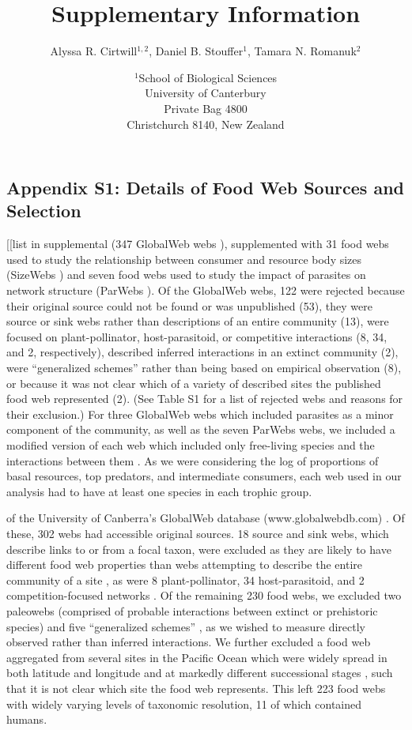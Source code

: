 \documentclass[12pt]{article}
\title{Supplementary Information}
\author{Alyssa R. Cirtwill$^{1,2}$, Daniel B. Stouffer$^{1}$, Tamara N. Romanuk$^{2}$}
\date{$^1$School of Biological Sciences\\University of Canterbury\\
Private Bag 4800\\Christchurch 8140, New Zealand}
\newcommand{\beginsupplement}{%
        \setcounter{table}{0}
        \renewcommand{\thetable}{S\arabic{table}}%
        \setcounter{figure}{0}
        \renewcommand{\thefigure}{S\arabic{figure}}%
     }
\begin{document}
\maketitle
\baselineskip=8.5mm

\vspace{0.4 in}
\beginsupplement
\begin{landscape}
\subsection*{Appendix S1: Details of Food Web Sources and Selection}

  [[list in supplemental (347 GlobalWeb webs \citep{GlobalWeb}), supplemented 
  with 31 food webs used to study the relationship between consumer and resource body sizes (SizeWebs \citep{Brose2006})
  and seven food webs used to study the impact of parasites on network structure (ParWebs \citep{Dunne2013}).
  Of the GlobalWeb webs, 122 were rejected because their original source could not be found or was unpublished (53), they were source or sink
  webs rather than descriptions of an entire community (13), were focused on plant-pollinator, host-parasitoid, or 
  competitive interactions (8, 34, and 2, respectively), described inferred interactions in an extinct community (2), were ``generalized 
  schemes'' rather than being based on empirical observation (8), or because it was not clear which of a variety of 
  described sites the published food web represented (2). (See Table S1 for a list of rejected webs and reasons for their
  exclusion.) For three GlobalWeb webs which included parasites as a minor component of the community, as well as the 
  seven ParWebs webs, we included a modified version of each web which included only free-living species and the 
  interactions between them \citep{Dunne2013}. 
  As we were considering the log of proportions of basal resources, top predators, and intermediate consumers, each web used in our analysis 
  had to have at least one species in each trophic group.

  of  the University of Canberra's GlobalWeb database (www.globalwebdb.com) 
  \citep{}. Of these, 302 webs had accessible original sources. 
  18 source and sink webs, which describe links to or from a focal taxon, were excluded as they are likely 
  to have different food web properties than webs attempting to
  describe the entire community of a site \citep{Williams2002}, as were 8 plant-pollinator, 34 host-parasitoid, and 2 
  competition-focused networks
  \citep{Riede2010}. Of the remaining 230 food webs, we excluded two paleowebs (comprised of probable interactions 
  between extinct or prehistoric species) \citep{Simenstad1978} and five ``generalized schemes'' 
  \citep{Nybakken1982,Percival1929,Swan1961,Landry1977,Petipa1979,Harrison1963}, as 
  we wished to measure
  directly observed rather than inferred interactions. We further excluded a food web aggregated from several sites in 
  the Pacific Ocean which were widely spread in both latitude and longitude and at markedly different successional stages
  \citep{Vinogradov1978}, such that it is not clear which site the food web represents. 
  This left 223 food webs with widely varying levels of taxonomic resolution, 11 of which contained humans. 


\end{landscape}
\end{document}
